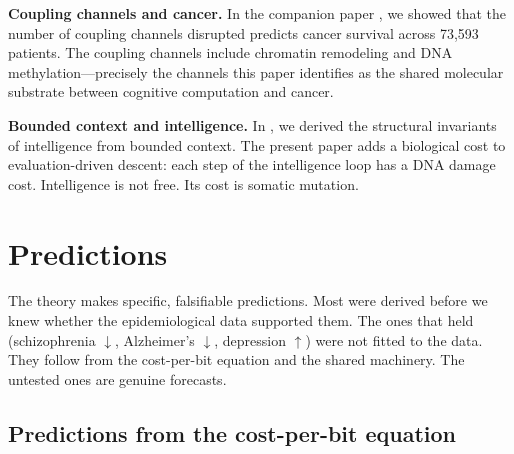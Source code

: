\documentclass[11pt]{article}
\theoremstyle{definition}
\begin{document}
\textbf{Coupling channels and cancer.} In the companion paper
\cite{McCarthy2026e}, we showed that the number of coupling
channels disrupted predicts cancer survival across 73,593 patients.
The coupling channels include chromatin remodeling and DNA
methylation---precisely the channels this paper identifies as
the shared molecular substrate between cognitive computation
and cancer.

\textbf{Bounded context and intelligence.} In \cite{McCarthy2026d},
we derived the structural invariants of intelligence from bounded
context. The present paper adds a biological cost to evaluation-driven
descent: each step of the intelligence loop has a DNA damage cost.
Intelligence is not free. Its cost is somatic mutation.

\section{Predictions}
\label{sec:predictions}

The theory makes specific, falsifiable predictions. Most were
derived before we knew whether the epidemiological data supported
them. The ones that held (schizophrenia $\downarrow$, Alzheimer's
$\downarrow$, depression $\uparrow$) were not fitted to the data.
They follow from the cost-per-bit equation and the shared machinery.
The untested ones are genuine forecasts.

\subsection{Predictions from the cost-per-bit equation}
\end{document}
